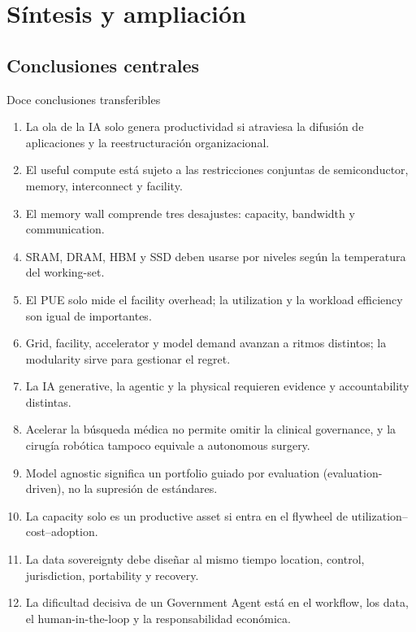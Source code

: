 \section{Síntesis y ampliación}

\subsection{Conclusiones centrales}

\begin{importantbox}{Doce conclusiones transferibles}
\begin{enumerate}
  \item La ola de la IA solo genera productividad si atraviesa la difusión de aplicaciones y la reestructuración organizacional.
  \item El useful compute está sujeto a las restricciones conjuntas de semiconductor, memory, interconnect y facility.
  \item El memory wall comprende tres desajustes: capacity, bandwidth y communication.
  \item SRAM, DRAM, HBM y SSD deben usarse por niveles según la temperatura del working-set.
  \item El PUE solo mide el facility overhead; la utilization y la workload efficiency son igual de importantes.
  \item Grid, facility, accelerator y model demand avanzan a ritmos distintos; la modularity sirve para gestionar el regret.
  \item La IA generative, la agentic y la physical requieren evidence y accountability distintas.
  \item Acelerar la búsqueda médica no permite omitir la clinical governance, y la cirugía robótica tampoco equivale a autonomous surgery.
  \item Model agnostic significa un portfolio guiado por evaluation (evaluation-driven), no la supresión de estándares.
  \item La capacity solo es un productive asset si entra en el flywheel de utilization--cost--adoption.
  \item La data sovereignty debe diseñar al mismo tiempo location, control, jurisdiction, portability y recovery.
  \item La dificultad decisiva de un Government Agent está en el workflow, los data, el human-in-the-loop y la responsabilidad económica.
\end{enumerate}
\end{importantbox}

